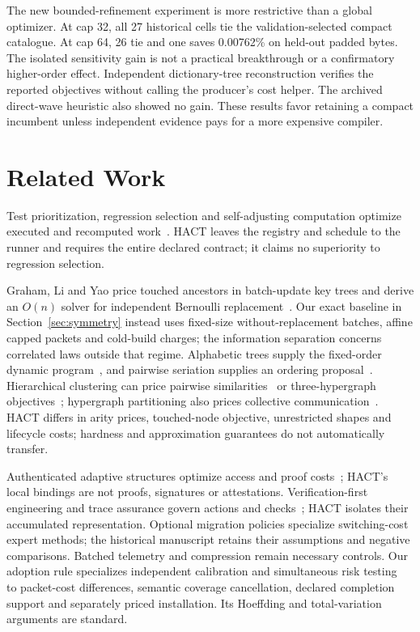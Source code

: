 \documentclass[10pt,journal,compsoc]{IEEEtran}
\theoremstyle{definition}\newtheorem{definition}[theorem]{Definition}
\begin{document}
The new bounded-refinement experiment is more restrictive than a global
optimizer. At cap 32, all 27 historical cells tie the validation-selected
compact catalogue. At cap 64, 26 tie and one saves 0.00762\% on held-out
padded bytes. The isolated sensitivity gain is not a practical breakthrough
or a confirmatory higher-order effect. Independent dictionary-tree
reconstruction verifies the reported objectives without calling the
producer's cost helper. The archived direct-wave heuristic also showed
no gain. These results favor retaining a compact incumbent unless
independent evidence pays for a more expensive compiler.






\section{Related Work}\label{sec:jrelated}
Test prioritization, regression selection and self-adjusting computation
optimize executed and recomputed work~\cite{rothermel,ekstazi,acar,build}.
HACT leaves the registry and schedule to the runner and requires the entire
declared contract; it claims no superiority to regression selection.

Graham, Li and Yao price touched ancestors in batch-update key trees and
derive an $O(n)$ solver for independent Bernoulli replacement~\cite{graham2007}.
Our exact baseline in Section~\ref{sec:symmetry} instead uses fixed-size
without-replacement batches, affine capped packets and cold-build charges;
the information separation concerns correlated laws outside that regime.
Alphabetic trees supply the fixed-order dynamic program~\cite{alphabetic},
and pairwise seriation supplies an ordering proposal~\cite{atkins}.
Hierarchical clustering can price pairwise similarities~\cite{dasgupta} or
three-hypergraph objectives~\cite{hyperhierarchy}; hypergraph partitioning
also prices collective communication~\cite{hyperpartition}. HACT differs in
arity prices, touched-node objective, unrestricted shapes and lifecycle costs;
hardness and approximation guarantees do not automatically transfer.

Authenticated adaptive structures optimize access and proof costs~\cite{hmt};
HACT's local bindings are not proofs, signatures or attestations.
Verification-first engineering and trace assurance govern actions and
checks~\cite{aiware,traceassurance}; HACT isolates their accumulated
representation. Optional migration policies specialize switching-cost expert
methods; the historical manuscript retains their assumptions and negative
comparisons. Batched telemetry and compression remain necessary controls.
Our adoption rule specializes independent calibration and simultaneous risk
testing~\cite{learntest} to packet-cost differences, semantic coverage
cancellation, declared completion support and separately priced installation.
Its Hoeffding and total-variation arguments are standard.
\end{document}
